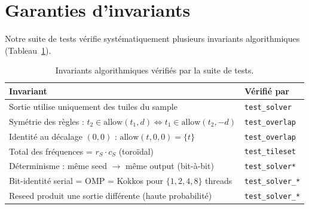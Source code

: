 \section{Garanties d'invariants}

Notre suite de tests vérifie systématiquement plusieurs invariants algorithmiques (Tableau~\ref{tab:invariants}).

\begin{table}[H]
\centering
\small
\begin{tabularx}{\textwidth}{Xl}
\toprule
\textbf{Invariant} & \textbf{Vérifié par} \\
\midrule
Sortie utilise uniquement des tuiles du sample & \texttt{test\_solver} \\
Symétrie des règles : $t_2 \in \text{allow}(t_1, d) \iff t_1 \in \text{allow}(t_2, -d)$ & \texttt{test\_overlap} \\
Identité au décalage $(0,0)$ : $\text{allow}(t, 0, 0) = \{t\}$ & \texttt{test\_overlap} \\
Total des fréquences = $r_S \cdot c_S$ (toroïdal) & \texttt{test\_tileset} \\
Déterminisme : même seed $\to$ même output (bit-à-bit) & \texttt{test\_solver*} \\
Bit-identité serial = OMP = Kokkos pour $\{1, 2, 4, 8\}$ threads & \texttt{test\_solver\_*} \\
Reseed produit une sortie différente (haute probabilité) & \texttt{test\_solver\_*} \\
\bottomrule
\end{tabularx}
\caption{Invariants algorithmiques vérifiés par la suite de tests.}
\label{tab:invariants}
\end{table}
